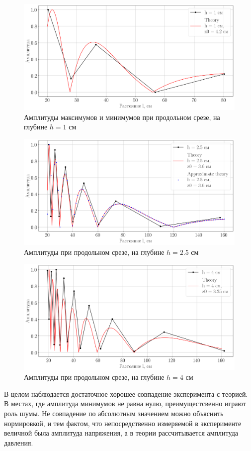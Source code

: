 \begin{figure}[h!]
	\centering
	\includegraphics[width =0.8\linewidth]{fig/task21}
	\caption{Амплитуды максимумов и минимумов при продольном срезе, на глубине $h=1$ см}
	\label{fig:task21}
\end{figure}
\begin{figure}[h!]
	\centering
	\includegraphics[width =0.8\linewidth]{fig/task22}
	\caption{Амплитуды при продольном срезе, на глубине $h=2.5$ см}
	\label{fig:task22}
\end{figure}
\begin{figure}[h!]
	\centering
	\includegraphics[width =0.8\linewidth]{fig/task23}
	\caption{Амплитуды при продольном срезе, на глубине $h=4$ см}
	\label{fig:task23}
\end{figure}

В целом наблюдается достаточное хорошее совпадение эксперимента с теорией. В местах, где амплитуда минимумов не равна
нулю, преимущестсвенно играют роль шумы. Не совпадение по абсолютным значением можно объяснить нормировкой, и тем
фактом, что непосредственно измеряемой в эксперименте величной была амплитуда напряжения, а в теории рассчитывается
амплитуда давления. 


